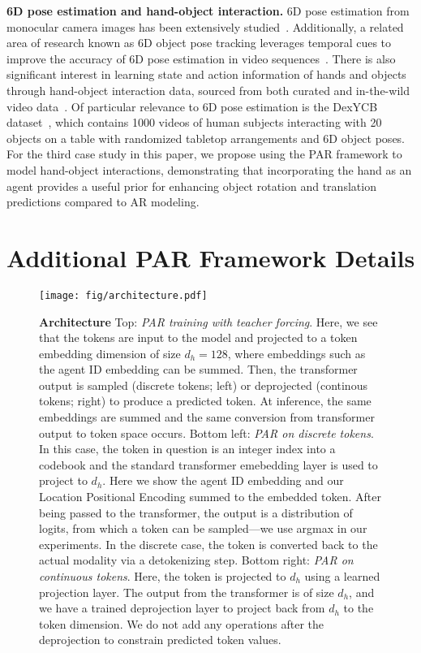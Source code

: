 \medskip
\noindent
\textbf{6D pose estimation and hand-object interaction.}
6D pose estimation from monocular camera images has been extensively studied~\citep{xiang2017posecnn, li2018deepim, trabelsi2021pose, wang2021gdr}. Additionally, a related area of research known as 6D object pose tracking leverages temporal cues to improve the accuracy of 6D pose estimation in video sequences~\citep{wen2020se, deng2021poserbpf, wen2023bundlesdf, wen2024foundationpose}. There is also significant interest in learning state and action information of hands and objects through hand-object interaction data, sourced from both curated and in-the-wild video data~\citep{wu2024reconstructing}. Of particular relevance to 6D pose estimation is the DexYCB dataset~\citep{chao2021dexycb}, which contains 1000 videos of human subjects interacting with 20 objects on a table with randomized tabletop arrangements and 6D object poses. For the third case study in this paper, we propose using the PAR framework to model hand-object interactions, demonstrating that incorporating the hand as an agent provides a useful prior for enhancing object rotation and translation predictions compared to AR modeling.


\section{Additional PAR Framework Details}
\label{sec:appendix_impl_details}

\begin{figure*}
    \centering
    \texttt{[image: fig/architecture.pdf]}
    \caption{
    \textbf{Architecture} Top: \textit{PAR training with teacher forcing}. Here, we see that the tokens are input to the model and projected to a token embedding dimension of size $d_h=128$, where embeddings such as the agent ID embedding can be summed. Then, the transformer output is sampled (discrete tokens; left) or deprojected (continous tokens; right) to produce a predicted token. At inference, the same embeddings are summed and the same conversion from transformer output to token space occurs. Bottom left: \textit{PAR on discrete tokens}. In this case, the token in question is an integer index into a codebook and the standard transformer emebedding layer is used to project to $d_h$. Here we show the agent ID embedding and our Location Positional Encoding summed to the embedded token. After being passed to the transformer, the output is a distribution of logits, from which a token can be sampled---we use argmax in our experiments. In the discrete case, the token is converted back to the actual modality via a detokenizing step. Bottom right: \textit{PAR on continuous tokens}. Here, the token is projected to $d_h$ using a learned projection layer. The output from the transformer is of size $d_h$, and we have a trained deprojection layer to project back from $d_h$ to the token dimension. We do not add any operations after the deprojection to constrain predicted token values.
    }
    \label{fig:arch}
    \vspace{-.5cm}
\end{figure*}


